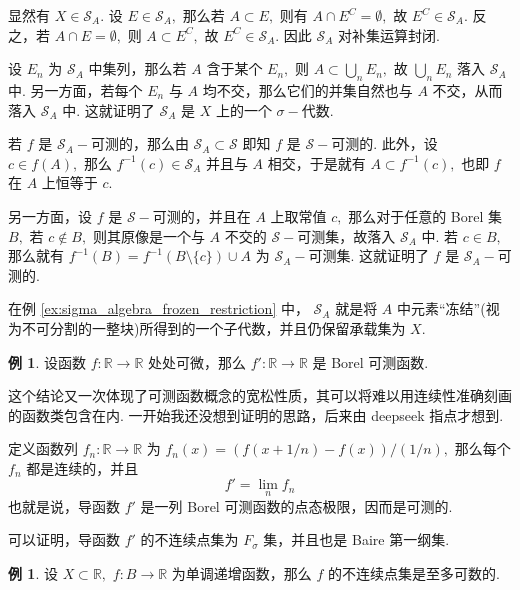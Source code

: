 \documentclass[12pt, a4paper, oneside]{book}
\numberwithin{figure}{section}
\theoremstyle{definition}
\newtheorem{example}[theorem]{例}
\begin{document}
显然有 $X\in \mathcal S_A.$ 设 $E\in \mathcal S_A,$ 那么若 $A\subset E,$ 则有 $A\cap E^C=\emptyset,$ 故 $E^C\in\mathcal S_A.$ 反之，若 $A\cap E=\emptyset,$ 则 $A\subset E^C,$ 故 $E^C\in\mathcal S_A.$ 
因此 $\mathcal S_A$ 对补集运算封闭.

设 $E_n$ 为 $\mathcal S_A$ 中集列，那么若 $A$ 含于某个 $E_n,$ 则 $A\subset\bigcup_n E_n,$ 故 $\bigcup_n E_n$ 落入 $\mathcal S_A$ 中. 另一方面，若每个 $E_n$ 与 $A$ 均不交，那么它们的并集自然也与 $A$ 不交，从而落入 $\mathcal S_A$ 中. 
这就证明了 $\mathcal S_A$ 是 $X$ 上的一个 $\sigma-$代数. 

若 $f$ 是 $\mathcal S_A-$可测的，那么由 $\mathcal S_A\subset\mathcal S$ 即知 $f$ 是 $\mathcal S-$可测的. 此外，设 $c\in f(A),$ 那么 $f^{-1}(c)\in\mathcal S_A$ 并且与 $A$ 相交，于是就有 $A\subset f^{-1}(c),$ 也即 $f$ 在 $A$ 上恒等于 $c.$ 

另一方面，设 $f$ 是 $\mathcal S-$可测的，并且在 $A$ 上取常值 $c,$ 那么对于任意的 Borel 集 $B,$ 若 $c\notin B,$ 则其原像是一个与 $A$ 不交的 $\mathcal S-$可测集，故落入 $\mathcal S_A$ 中.
若 $c\in B,$ 那么就有 $f^{-1}(B)=f^{-1}(B\setminus\{c\})\cup A$ 为 $\mathcal S_A-$可测集. 这就证明了 $f$ 是 $\mathcal S_A-$可测的.

在例 \ref{ex:sigma_algebra_frozen_restriction} 中，
$\mathcal S_A$ 就是将 $A$ 中元素``冻结''(视为不可分割的一整块)所得到的一个子代数，并且仍保留承载集为 $X.$ 



\begin{example}
    设函数 $f:\mathbb R\to\mathbb R$ 处处可微，那么 $f':\mathbb R\to\mathbb R$ 是 Borel 可测函数.
\end{example}

这个结论又一次体现了可测函数概念的宽松性质，其可以将难以用连续性准确刻画的函数类包含在内.
一开始我还没想到证明的思路，后来由 deepseek 指点才想到. 

定义函数列 $f_n:\mathbb R\to\mathbb R$ 为 $f_n(x) = (f(x+1/n)-f(x))/(1/n),$ 那么每个 $f_n$ 都是连续的，并且
\begin{equation}
    f'=\lim_{n}f_n
\end{equation}
也就是说，导函数 $f'$ 是一列 Borel 可测函数的点态极限，因而是可测的.

可以证明，导函数 $f'$ 的不连续点集为 $F_\sigma$ 集，并且也是 Baire 第一纲集.

\begin{example}\label{ex:monotone_function_discontinuous_point_set_at_most_countable}
    设 $X\subset\mathbb R,$ $f:B\to\mathbb R$ 为单调递增函数，那么 $f$ 的不连续点集是至多可数的.
\end{example}
\end{document}
